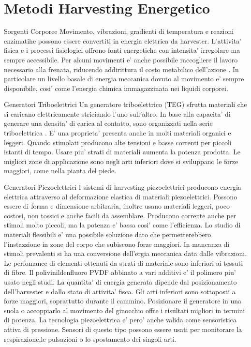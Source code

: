 \chapter{Metodi Harvesting Energetico}

\begin{section}{Sorgenti Corporee}
   Movimento, vibrazioni, gradienti di temperatura e reazioni enzimatihe possono essere convertiti in energia elettrica da harvester. L'attivita' fisica e i processi fisiologici offrono fonti energetiche con intensita' irregolare ma sempre accessibile. Per alcuni movimenti e' anche possibile raccogliere il lavoro necessario alla frenata, riducendo addirittura il costo metabilico dell'azione \cite{liuBiomechanicalEnergyHarvesting2022}. In particolare un livello basale di energia meccanica dovuto al movimento e' sempre disponibile, cosi' come l'energia chimica immagazzinata nei liquidi corporei.
   
   \begin{subsection}{Generatori Triboelettrici}
    Un generatore triboelettrico (TEG) sfrutta materiali che si caricano elettricamente striciando l'uno sull'altro. In base alla capacita' di generare una densita' di carica al contatto, sono organizzati nella serie triboelettrica \cite{zouQuantifyingTriboelectricSeries2019}. E' una proprieta' presenta anche in molti materiali organici e leggeri. Quando stimolati producono alte tensioni e basse correnti per piccoli istanti di tempo. Usare piu' strati di materiali aumenta la potenza prodotta. Le migliori zone di applicazione sono negli arti inferiori dove si sviluppano le forze maggiori, come nella pianta del piede.
   \end{subsection}

   \begin{subsection}{Generatori Piezoelettrici}
    I sistemi di harvesting piezoelettrici producono energia elettrica attraverso al deformazione elastica di materiali piezoelettrici. Possono essere di forma e dimensione arbitraria, inoltre usano materiali leggeri, poco costosi, non tossici e anche facili da assemblare. Producono corrente anche per stimoli molto piccoli, ma la potenza e' bassa cosi' come l'efficienza. Lo studio di materiali flessibili e' una possibile soluzione dato che permetterebbero l'instazzione in zone del corpo che subiscono forze maggiori. In mancanza di stimoli prevalenti si ha una conversione dell'ergia meccanica data dalle vibrazioni. Le perfomance di elementi ottenuti da strati di materiale sono inferiori ai tessuti di fibre. Il polivinildenfluoro PVDF abbinato a vari additivi e' il polimero piu' usato negli studi. La quantita' di energia generata dipende dal posizionamento dell'harvester e dallo stato di attivita' fisca. Gli arti inferiori sono sottoposti a forze maggiori, soprattutto durante il cammino. Posizionare il generatore in una suola o accoppiarlo al movimento del ginocchio offre i risultati migliori in termini di potenza. La tecnologia piezoelettrica e' pero' anche valida come sensoristica attiva di pressione. Sensori di questo tipo possono essere usati per monitorare la respirazione,le pulsazioni o lo spostamento dei singoli arti.
   \end{subsection}


\end{section}
